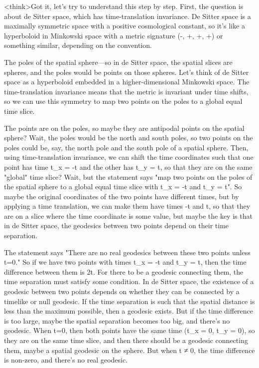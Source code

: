<think>Got it, let's try to understand this step by step. First, the question is about de Sitter space, which has time-translation invariance. De Sitter space is a maximally symmetric space with a positive cosmological constant, so it's like a hyperboloid in Minkowski space with a metric signature (-, +, +, +) or something similar, depending on the convention. 

The poles of the spatial sphere—so in de Sitter space, the spatial slices are spheres, and the poles would be points on those spheres. Let's think of de Sitter space as a hyperboloid embedded in a higher-dimensional Minkowski space. The time-translation invariance means that the metric is invariant under time shifts, so we can use this symmetry to map two points on the poles to a global equal time slice. 

The points are on the poles, so maybe they are antipodal points on the spatial sphere? Wait, the poles would be the north and south poles, so two points on the poles could be, say, the north pole and the south pole of a spatial sphere. Then, using time-translation invariance, we can shift the time coordinates such that one point has time t_x = -t and the other has t_y = t, so that they are on the same "global" time slice? Wait, but the statement says "map two points on the poles of the spatial sphere to a global equal time slice with t_x = -t and t_y = t". So maybe the original coordinates of the two points have different times, but by applying a time translation, we can make them have times -t and t, so that they are on a slice where the time coordinate is some value, but maybe the key is that in de Sitter space, the geodesics between two points depend on their time separation. 

The statement says "There are no real geodesics between these two points unless t=0." So if we have two points with times t_x = -t and t_y = t, then the time difference between them is 2t. For there to be a geodesic connecting them, the time separation must satisfy some condition. In de Sitter space, the existence of a geodesic between two points depends on whether they can be connected by a timelike or null geodesic. If the time separation is such that the spatial distance is less than the maximum possible, then a geodesic exists. But if the time difference is too large, maybe the spatial separation becomes too big, and there's no geodesic. When t=0, then both points have the same time (t_x = 0, t_y = 0), so they are on the same time slice, and then there should be a geodesic connecting them, maybe a spatial geodesic on the sphere. But when t ≠ 0, the time difference is non-zero, and there's no real geodesic. 

